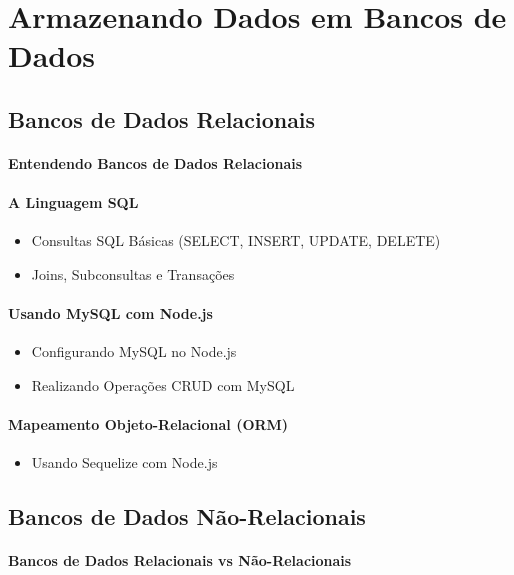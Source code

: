 

\chapter{Armazenando Dados em Bancos de Dados}
\section{Bancos de Dados Relacionais}

\subsubsection{Entendendo Bancos de Dados Relacionais}
\subsubsection{A Linguagem SQL}
\begin{itemize}
\item Consultas SQL Básicas (SELECT, INSERT, UPDATE, DELETE)
\item Joins, Subconsultas e Transações
\end{itemize}
\subsubsection{Usando MySQL com Node.js}
\begin{itemize}
\item Configurando MySQL no Node.js
\item Realizando Operações CRUD com MySQL
\end{itemize}
\subsubsection{Mapeamento Objeto-Relacional (ORM)}
\begin{itemize}
\item Usando Sequelize com Node.js
\end{itemize}


\section{Bancos de Dados Não-Relacionais}

\subsubsection{Bancos de Dados Relacionais vs Não-Relacionais}
